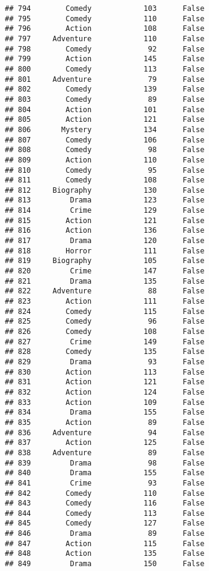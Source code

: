 \documentclass[
]{article}
\begin{document}
\begin{verbatim}
## 794        Comedy            103      False
## 795        Comedy            110      False
## 796        Action            108      False
## 797     Adventure            110      False
## 798        Comedy             92      False
## 799        Action            145      False
## 800        Comedy            113      False
## 801     Adventure             79      False
## 802        Comedy            139      False
## 803        Comedy             89      False
## 804        Action            101      False
## 805        Action            121      False
## 806       Mystery            134      False
## 807        Comedy            106      False
## 808        Comedy             98      False
## 809        Action            110      False
## 810        Comedy             95      False
## 811        Comedy            108      False
## 812     Biography            130      False
## 813         Drama            123      False
## 814         Crime            129      False
## 815        Action            121      False
## 816        Action            136      False
## 817         Drama            120      False
## 818        Horror            111      False
## 819     Biography            105      False
## 820         Crime            147      False
## 821         Drama            135      False
## 822     Adventure             88      False
## 823        Action            111      False
## 824        Comedy            115      False
## 825        Comedy             96      False
## 826        Comedy            108      False
## 827         Crime            149      False
## 828        Comedy            135      False
## 829         Drama             93      False
## 830        Action            113      False
## 831        Action            121      False
## 832        Action            124      False
## 833        Action            109      False
## 834         Drama            155      False
## 835        Action             89      False
## 836     Adventure             94      False
## 837        Action            125      False
## 838     Adventure             89      False
## 839         Drama             98      False
## 840         Drama            155      False
## 841         Crime             93      False
## 842        Comedy            110      False
## 843        Comedy            116      False
## 844        Comedy            113      False
## 845        Comedy            127      False
## 846         Drama             89      False
## 847        Action            115      False
## 848        Action            135      False
## 849         Drama            150      False

\end{verbatim}
\end{document}
